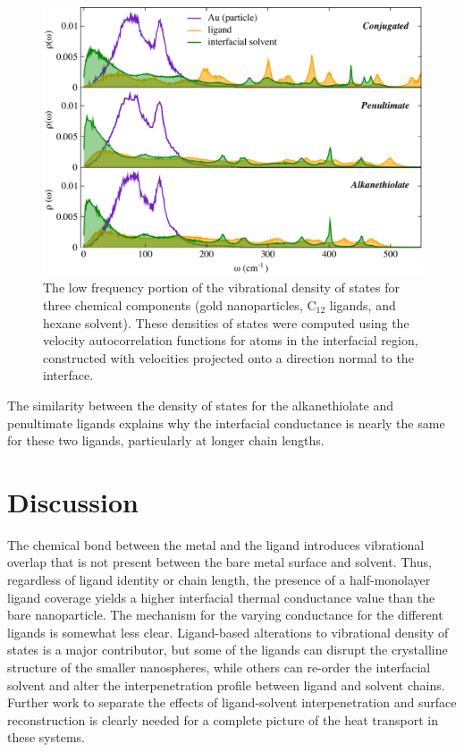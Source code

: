 \begin{figure}
  \includegraphics[width=\linewidth]{figures/rho_omega_12}
  \caption{The low frequency portion of the vibrational density of
    states for three chemical components (gold nanoparticles, C$_{12}$
    ligands, and hexane solvent). These densities of states were
    computed using the velocity autocorrelation functions for atoms in
    the interfacial region, constructed with velocities projected onto
    a direction normal to the interface.}
  \label{fig:vdos}
\end{figure}

The similarity between the density of states for the alkanethiolate
and penultimate ligands explains why the interfacial
conductance is nearly the same for these two ligands, particularly at
longer chain lengths.

\section{Discussion}

The chemical bond between the metal and the ligand introduces
vibrational overlap that is not present between the bare metal surface
and solvent. Thus, regardless of ligand identity or chain length, the
presence of a half-monolayer ligand coverage yields a higher
interfacial thermal conductance value than the bare nanoparticle.  The
mechanism for the varying conductance for the different ligands is
somewhat less clear.  Ligand-based alterations to vibrational density
of states is a major contributor, but some of the ligands can disrupt
the crystalline structure of the smaller nanospheres, while others can
re-order the interfacial solvent and alter the interpenetration
profile between ligand and solvent chains. Further work to separate
the effects of ligand-solvent interpenetration and surface
reconstruction is clearly needed for a complete picture of the heat
transport in these systems.
